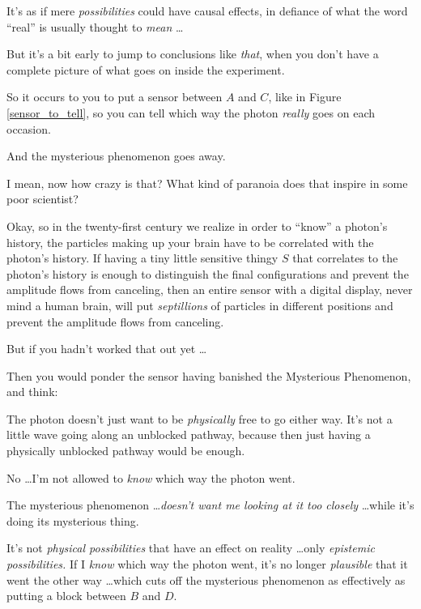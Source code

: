 {
 It's as if mere \textit{possibilities} could have
causal effects, in defiance of what the word
``real'' is usually thought to
\textit{mean} \ldots}

{
 But it's a bit early to jump to conclusions like
\textit{that}, when you don't have a complete picture
of what goes on inside the experiment.}


{
 So it occurs to you to put a sensor between $A$ and $C$, like in
Figure \ref{sensor_to_tell}, so you can tell which way the photon \textit{really} goes
on each occasion.}

{
 And the mysterious phenomenon goes away.}

{
 I mean, now how crazy is that? What kind of paranoia does that
inspire in some poor scientist?}

{
 Okay, so in the twenty-first century we realize in order to
``know'' a photon's
history, the particles making up your brain have to be correlated with
the photon's history. If having a tiny little sensitive
thingy $S$ that correlates to the photon's history is
enough to distinguish the final configurations and prevent the
amplitude flows from canceling, then an entire sensor with a digital
display, never mind a human brain, will put \textit{septillions} of
particles in different positions and prevent the amplitude flows from
canceling.}

{
 But if you hadn't worked that out yet \ldots}

{
 Then you would ponder the sensor having banished the Mysterious
Phenomenon, and think:}

{
 The photon doesn't just want to be
\textit{physically} free to go either way. It's not a
little wave going along an unblocked pathway, because then just having
a physically unblocked pathway would be enough.}

{
 No \ldots I'm not allowed to \textit{know} which
way the photon went.}

{
 The mysterious phenomenon \ldots \textit{doesn't
want me looking at it too closely} \ldots while it's
doing its mysterious thing.}

{
 It's not \textit{physical possibilities} that have
an effect on reality \ldots only \textit{epistemic possibilities.} If I
\textit{know} which way the photon went, it's no longer
\textit{plausible} that it went the other way \ldots which cuts off the
mysterious phenomenon as effectively as putting a block between $B$ and
$D$.}


